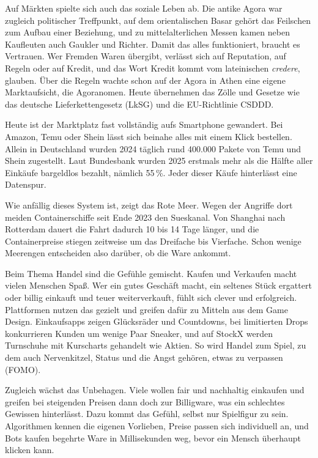 \documentclass[11pt, a4paper]{article}
\begin{document}
Auf Märkten spielte sich auch das soziale Leben ab. Die antike Agora war zugleich politischer Treffpunkt, auf dem orientalischen Basar
gehört das Feilschen zum Aufbau einer Beziehung, und zu mittelalterlichen Messen kamen neben Kaufleuten auch Gaukler und Richter.
Damit das alles funktioniert, braucht es Vertrauen. Wer Fremden Waren übergibt, verlässt sich auf Reputation, auf Regeln oder auf
Kredit, und das Wort Kredit kommt vom lateinischen \emph{credere}, glauben. Über die Regeln wachte schon auf der Agora in Athen eine
eigene Marktaufsicht, die Agoranomen. Heute übernehmen das Zölle und Gesetze wie das deutsche Lieferkettengesetz (LkSG) und die
EU-Richtlinie CSDDD.

Heute ist der Marktplatz fast vollständig aufs Smartphone gewandert. Bei Amazon, Temu oder Shein lässt sich beinahe alles mit einem
Klick bestellen. Allein in Deutschland wurden 2024 täglich rund 400.000 Pakete von Temu und Shein zugestellt. Laut Bundesbank wurden
2025 erstmals mehr als die Hälfte aller Einkäufe bargeldlos bezahlt, nämlich 55\,\%. Jeder dieser Käufe hinterlässt eine Datenspur.

Wie anfällig dieses System ist, zeigt das Rote Meer. Wegen der Angriffe dort meiden Containerschiffe seit Ende 2023 den Sueskanal. Von Shanghai nach Rotterdam dauert die Fahrt dadurch 10 bis 14 Tage länger, und die
Containerpreise stiegen zeitweise um das Dreifache bis Vierfache. Schon wenige Meerengen entscheiden also darüber, ob die Ware ankommt.

Beim Thema Handel sind die Gefühle gemischt. Kaufen und Verkaufen macht vielen Menschen Spaß. Wer ein gutes Geschäft macht, ein seltenes
Stück ergattert oder billig einkauft und teuer weiterverkauft, fühlt sich clever und erfolgreich. Plattformen nutzen das gezielt und
greifen dafür zu Mitteln aus dem Game Design. Einkaufsapps zeigen Glücksräder und Countdowns, bei limitierten Drops konkurrieren Kunden
um wenige Paar Sneaker, und auf StockX werden Turnschuhe mit Kurscharts gehandelt wie Aktien. So wird Handel zum Spiel, zu dem auch
Nervenkitzel, Status und die Angst gehören, etwas zu verpassen (FOMO).

Zugleich wächst das Unbehagen. Viele wollen fair und nachhaltig einkaufen und greifen bei steigenden Preisen dann doch zur Billigware,
was ein schlechtes Gewissen hinterlässt. Dazu kommt das Gefühl, selbst nur Spielfigur zu sein.
Algorithmen kennen die eigenen Vorlieben, Preise passen sich individuell an, und Bots kaufen begehrte Ware in Millisekunden weg, bevor
ein Mensch überhaupt klicken kann.
\end{document}
